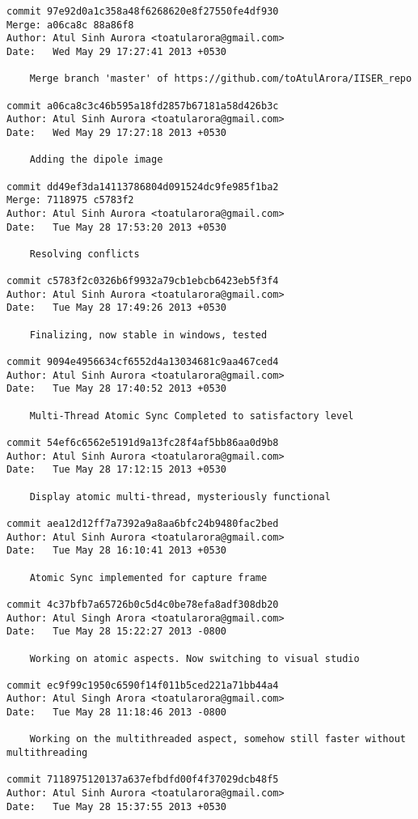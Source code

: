 \begin{lstlisting}
commit 97e92d0a1c358a48f6268620e8f27550fe4df930
Merge: a06ca8c 88a86f8
Author: Atul Sinh Aurora <toatularora@gmail.com>
Date:   Wed May 29 17:27:41 2013 +0530

    Merge branch 'master' of https://github.com/toAtulArora/IISER_repo

commit a06ca8c3c46b595a18fd2857b67181a58d426b3c
Author: Atul Sinh Aurora <toatularora@gmail.com>
Date:   Wed May 29 17:27:18 2013 +0530

    Adding the dipole image

commit dd49ef3da14113786804d091524dc9fe985f1ba2
Merge: 7118975 c5783f2
Author: Atul Sinh Aurora <toatularora@gmail.com>
Date:   Tue May 28 17:53:20 2013 +0530

    Resolving conflicts

commit c5783f2c0326b6f9932a79cb1ebcb6423eb5f3f4
Author: Atul Sinh Aurora <toatularora@gmail.com>
Date:   Tue May 28 17:49:26 2013 +0530

    Finalizing, now stable in windows, tested

commit 9094e4956634cf6552d4a13034681c9aa467ced4
Author: Atul Sinh Aurora <toatularora@gmail.com>
Date:   Tue May 28 17:40:52 2013 +0530

    Multi-Thread Atomic Sync Completed to satisfactory level

commit 54ef6c6562e5191d9a13fc28f4af5bb86aa0d9b8
Author: Atul Sinh Aurora <toatularora@gmail.com>
Date:   Tue May 28 17:12:15 2013 +0530

    Display atomic multi-thread, mysteriously functional

commit aea12d12ff7a7392a9a8aa6bfc24b9480fac2bed
Author: Atul Sinh Aurora <toatularora@gmail.com>
Date:   Tue May 28 16:10:41 2013 +0530

    Atomic Sync implemented for capture frame

commit 4c37bfb7a65726b0c5d4c0be78efa8adf308db20
Author: Atul Singh Arora <toatularora@gmail.com>
Date:   Tue May 28 15:22:27 2013 -0800

    Working on atomic aspects. Now switching to visual studio

commit ec9f99c1950c6590f14f011b5ced221a71bb44a4
Author: Atul Singh Arora <toatularora@gmail.com>
Date:   Tue May 28 11:18:46 2013 -0800

    Working on the multithreaded aspect, somehow still faster without multithreading

commit 7118975120137a637efbdfd00f4f37029dcb48f5
Author: Atul Sinh Aurora <toatularora@gmail.com>
Date:   Tue May 28 15:37:55 2013 +0530


\end{lstlisting}
